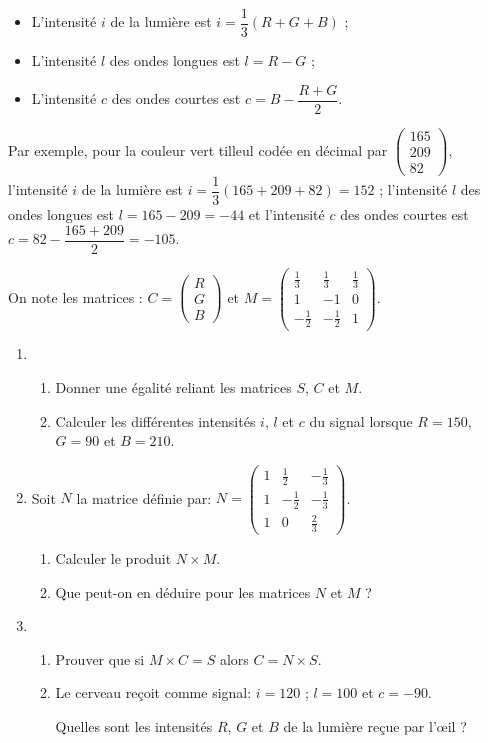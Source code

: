 \documentclass[10pt]{article}
\begin{document}
\setlength\parindent{9mm}
\begin{itemize}[label=\textbullet]
\item L'intensité $i$ de la lumière est $i= \dfrac{1}{3}(R + G + B)$ ;
\item L'intensité $l$ des ondes longues est $l = R - G$ ;
\item L'intensité $c$ des ondes courtes est $c = B - \dfrac{R + G}{2}$.
\end{itemize}
\setlength\parindent{0mm}

Par exemple, pour la couleur \og vert tilleul \fg{} codée en décimal par $\begin{pmatrix}165\\209\\82\end{pmatrix}$, l'intensité $i$ de la lumière est $i = \dfrac{1}{3}(165 + 209 + 82) = 152$ ; l'intensité $l$ des ondes longues est $l = 165 - 209 = - 44$  et l'intensité $c$ des ondes courtes est $c = 82 - \dfrac{165 + 209}{2} = - 105$.

On note les matrices : $C = \begin{pmatrix}R\\G\\B\end{pmatrix}$ et $M = \begin{pmatrix}\frac{1}{3}&\frac{1}{3}&\frac{1}{3}\\1&-1&0\\-\frac{1}{2}&-\frac{1}{2}&1\end{pmatrix}$.

\medskip

\begin{enumerate}
\item 
	\begin{enumerate}
		\item Donner une égalité reliant les matrices $S$, $C$ et $M$.
		\item Calculer les différentes intensités $i$, $l$ et $c$ du signal lorsque $R = 150$, $G
		 = 90$ et $B = 210$.
	\end{enumerate}
\item Soit $N$ la matrice définie par: $N = \begin{pmatrix}1&\frac{1}{2}&-\frac{1}{3}\\1
&- \frac{1}{2}&-\frac{1}{3}\\1&0&\frac{2}{3}\end{pmatrix}$.
	\begin{enumerate}
		\item Calculer le produit $N \times M$.
		\item Que peut-on en déduire pour les matrices $N$ et $M$ ?
	\end{enumerate}
\item 
	\begin{enumerate}
		\item Prouver que si $M \times  C= S$ alors $C = N \times S$.
		\item Le cerveau reçoit comme signal: $i = 120$ ; $l = 100$ et $c = - 90$.
		
Quelles sont les intensités $R$, $G$ et $B$ de la lumière reçue par l'œil ?
	\end{enumerate} 
\end{enumerate}
\end{document}
